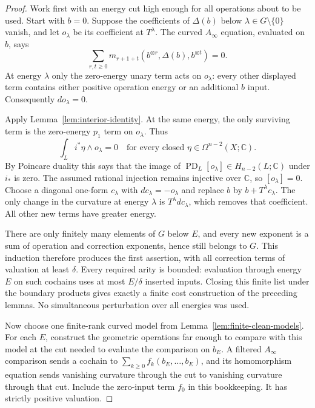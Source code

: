 \documentclass[11pt]{article}
\numberwithin{equation}{section}
\theoremstyle{definition}
\theoremstyle{remark}
\begin{document}
\begin{proof}
Work first with an energy cut high enough for all operations about to
be used.  Start with $b=0$.  Suppose the coefficients of $\Delta(b)$
below $\lambda\in G\setminus\{0\}$ vanish, and let $o_\lambda$ be its
coefficient at $T^\lambda$.  The curved $A_\infty$ equation, evaluated
on $b$, says
\[
 \sum_{r,t\geq0}
 m_{r+1+t}(b^{\otimes r},\Delta(b),b^{\otimes t})=0.
\]
At energy $\lambda$ only the zero-energy unary term acts on
$o_\lambda$: every other displayed term contains either positive
operation energy or an additional $b$ input.  Consequently
$d o_\lambda=0$.

Apply Lemma~\ref{lem:interior-identity}.  At the same energy, the only
surviving term is the zero-energy $p_1$ term on $o_\lambda$.  Thus
\begin{equation}
 \label{eq:floer-obstruction-pairing}
 \int_L i^*\eta\wedge o_\lambda=0
 \quad\text{for every closed }\eta\in\Omega^{n-2}(X;\mathbb C).
\end{equation}
By Poincare duality this says that the image of
$\operatorname{PD}_L[o_\lambda]\in H_{n-2}(L;\mathbb C)$ under $i_*$ is
zero.  The assumed rational injection remains injective over $\mathbb C$,
so $[o_\lambda]=0$.  Choose a diagonal one-form $c_\lambda$ with
$dc_\lambda=-o_\lambda$ and replace $b$ by
$b+T^\lambda c_\lambda$.  The only change in the curvature at energy
$\lambda$ is $T^\lambda dc_\lambda$, which removes that coefficient.
All other new terms have greater energy.

There are only finitely many elements of $G$ below $E$, and every
new exponent is a sum of operation and correction exponents, hence
still belongs to $G$.  This induction therefore produces the first
assertion, with all correction terms of valuation at least $\delta$.
Every required arity is bounded: evaluation through energy $E$ on such cochains
uses at most $E/\delta$ inserted inputs.  Closing this finite list
under the boundary products gives exactly a finite cost construction
of the preceding lemmas.  No simultaneous perturbation over all
energies was used.

Now choose one finite-rank curved model from
Lemma~\ref{lem:finite-clean-models}.  For each $E$, construct the
geometric operations far enough to compare with this model at the
cut needed to evaluate the comparison on $b_E$.  A filtered
$A_\infty$ comparison sends a cochain to
$\sum_{k\geq0}f_k(b_E,\ldots,b_E)$, and its homomorphism equation
sends vanishing curvature through the cut to vanishing curvature
through that cut.  Include the zero-input term $f_0$ in this
bookkeeping.  It has strictly positive valuation.


\end{proof}
\end{document}
